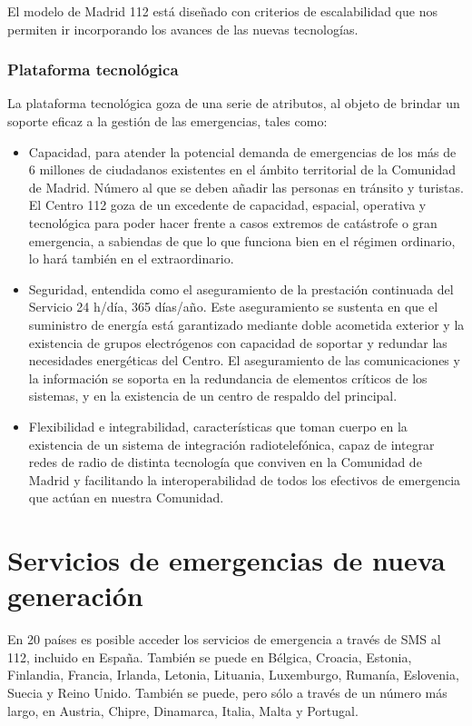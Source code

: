 El modelo de Madrid 112 está diseñado con criterios de escalabilidad que nos permiten ir incorporando los avances de las nuevas tecnologías.

\subsubsection{Plataforma tecnológica}

La plataforma tecnológica goza de una serie de atributos, al objeto de brindar un soporte eficaz a la gestión de las emergencias, tales como:

\begin{itemize}
  \item Capacidad, para atender la potencial demanda de emergencias de los más de 6 millones de ciudadanos existentes en el ámbito territorial de la Comunidad de Madrid. Número al que se deben añadir las personas en tránsito y turistas. El Centro 112 goza de un excedente de capacidad, espacial, operativa y tecnológica para poder hacer frente a casos extremos de catástrofe o gran emergencia, a sabiendas de que lo que funciona bien en el régimen ordinario, lo hará también en el extraordinario.
  \item Seguridad, entendida como el aseguramiento de la prestación continuada del Servicio 24 h/día, 365 días/año. Este aseguramiento se sustenta en que el suministro de energía está garantizado mediante doble acometida exterior y la existencia de grupos electrógenos con capacidad de soportar y redundar las necesidades energéticas del Centro. El aseguramiento de las comunicaciones y la información se soporta en la redundancia de elementos críticos de los sistemas, y en la existencia de un centro de respaldo del principal.
  \item Flexibilidad e integrabilidad, características que toman cuerpo en la existencia de un sistema de integración radiotelefónica, capaz de integrar redes de radio de distinta tecnología que conviven en la Comunidad de Madrid y facilitando la interoperabilidad de todos los efectivos de emergencia que actúan en nuestra Comunidad.
\end{itemize}

\clearpage

\section{Servicios de emergencias de nueva generación}

En 20 países es posible acceder los servicios de emergencia a través de SMS al 112, incluido en España. También se puede en Bélgica, Croacia, Estonia, Finlandia, Francia, Irlanda, Letonia, Lituania, Luxemburgo, Rumanía, Eslovenia, Suecia y Reino Unido. También se puede, pero sólo a través de un número más largo, en Austria, Chipre, Dinamarca, Italia, Malta y Portugal.

